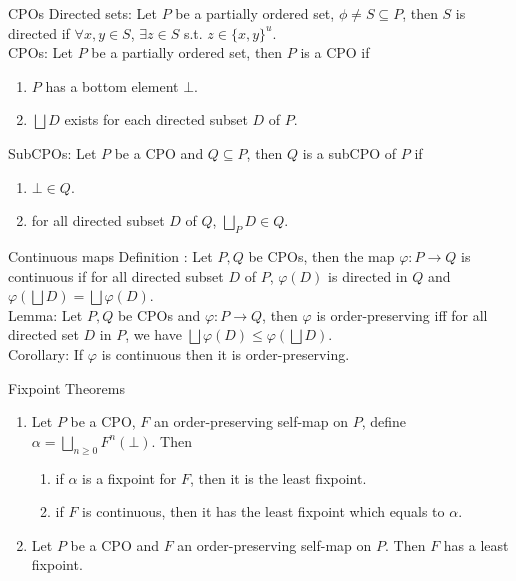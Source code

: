 \documentclass[%
pdf,
colorBG,
slideColor,
azure
]{prosper}
\begin{document}
\begin{slide}{CPOs}
Directed sets: Let $P$ be a partially ordered set, $\phi \neq S \subseteq P$, then $S$ is directed if $\forall x,y \in S$, $\exists z \in S$ s.t. $z \in \{x,y\}^u$.\\
\bigskip
CPOs: Let $P$ be a partially ordered set, then $P$ is a CPO if 
\begin{enumerate}
\item $P$ has a bottom element $\bot$.
\item $\bigsqcup D$ exists for each directed subset $D$ of $P$.
\end{enumerate}
\bigskip
SubCPOs: Let $P$ be a CPO and $Q \subseteq P$, then $Q$ is a subCPO of $P$ if
\begin{enumerate}
\item $\bot \in Q$.
\item for all directed subset $D$ of $Q$, $\bigsqcup_P D \in Q$.
\end{enumerate}
\end{slide}

\begin{slide}{Continuous maps}
Definition : Let $P,Q$ be CPOs, then the map $\varphi :P \rightarrow Q$ is continuous if for all directed subset $D$ of $P$, $\varphi (D)$ is directed in $Q$ and $\varphi (\bigsqcup D) = \bigsqcup \varphi (D)$.\\
\bigskip
Lemma: Let $P,Q$ be CPOs and $\varphi : P \rightarrow Q$, then $\varphi$ is order-preserving iff for all directed set $D$ in $P$, we have $\bigsqcup \varphi (D) \leq \varphi(\bigsqcup D)$.\\
\bigskip
Corollary: If $\varphi$ is continuous then it is order-preserving.   
\end{slide}

\begin{slide}{Fixpoint Theorems}
\begin{enumerate}
\item Let $P$ be a CPO, $F$ an order-preserving self-map on $P$, define $\alpha = \bigsqcup_{n \geq 0}F^n(\bot)$. Then 
\begin{enumerate}
\item if $\alpha$ is a fixpoint for $F$, then it is the least fixpoint.
\item if $F$ is continuous, then it has the least fixpoint which equals to $\alpha$.
\end{enumerate}
\item Let $P$ be a CPO and $F$ an order-preserving self-map on $P$. Then $F$ has a least fixpoint.
\end{enumerate}
\end{slide}
\end{document}
